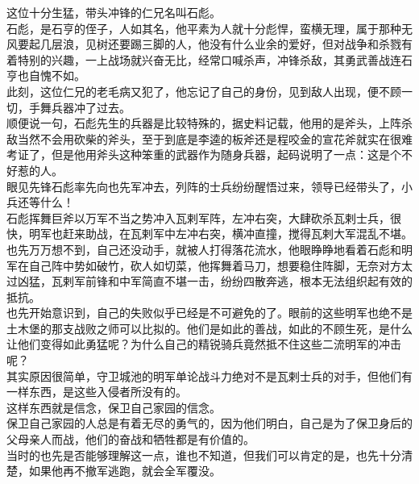 \begin{multicols}{\theparacolNo}
这位十分生猛，带头冲锋的仁兄名叫石彪。\\

石彪，是石亨的侄子，人如其名，他平素为人就十分彪悍，蛮横无理，属于那种无风要起几层浪，见树还要踢三脚的人，他没有什么业余的爱好，但对战争和杀戮有着特别的兴趣，一上战场就兴奋无比，经常口喊杀声，冲锋杀敌，其勇武善战连石亨也自愧不如。\\

此刻，这位仁兄的老毛病又犯了，他忘记了自己的身份，见到敌人出现，便不顾一切，手舞兵器冲了过去。\\

顺便说一句，石彪先生的兵器是比较特殊的，据史料记载，他用的是斧头，上阵杀敌当然不会用砍柴的斧头，至于到底是李逵的板斧还是程咬金的宣花斧就实在很难考证了，但是他用斧头这种笨重的武器作为随身兵器，起码说明了一点：这是个不好惹的人。\\

眼见先锋石彪率先向也先军冲去，列阵的士兵纷纷醒悟过来，领导已经带头了，小兵还等什么！\\

石彪挥舞巨斧以万军不当之势冲入瓦剌军阵，左冲右突，大肆砍杀瓦剌士兵，很快，明军也赶来助战，在瓦剌军中左冲右突，横冲直撞，搅得瓦剌大军混乱不堪。\\

也先万万想不到，自己还没动手，就被人打得落花流水，他眼睁睁地看着石彪和明军在自己阵中势如破竹，砍人如切菜，他挥舞着马刀，想要稳住阵脚，无奈对方太过凶猛，瓦剌军前锋和中军简直不堪一击，纷纷四散奔逃，根本无法组织起有效的抵抗。\\

也先开始意识到，自己的失败似乎已经是不可避免的了。眼前的这些明军也绝不是土木堡的那支战败之师可以比拟的。他们是如此的善战，如此的不顾生死，是什么让他们变得如此勇猛呢？为什么自己的精锐骑兵竟然抵不住这些二流明军的冲击呢？\\

其实原因很简单，守卫城池的明军单论战斗力绝对不是瓦剌士兵的对手，但他们有一样东西，是这些入侵者所没有的。\\

这样东西就是信念，保卫自己家园的信念。\\

保卫自己家园的人总是有着无尽的勇气的，因为他们明白，自己是为了保卫身后的父母亲人而战，他们的奋战和牺牲都是有价值的。\\

当时的也先是否能够理解这一点，谁也不知道，但我们可以肯定的是，也先十分清楚，如果他再不撤军逃跑，就会全军覆没。\\


\end{multicols}
